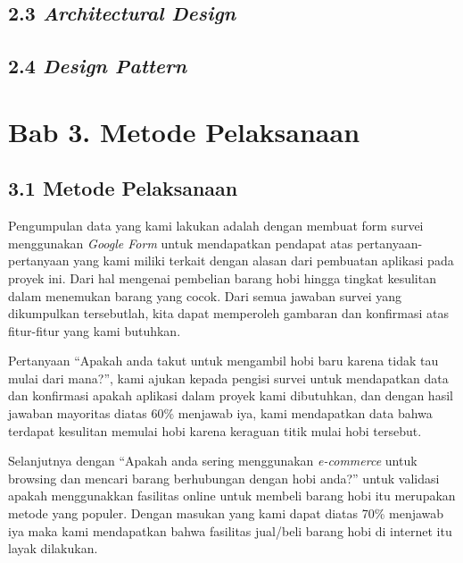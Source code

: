 \documentclass[a4paper]{article}
\begin{document}
\subsection*{2.3 \textit{Architectural Design}}

\subsection*{2.4 \textit{Design Pattern}}

\newpage
\section*{Bab 3. Metode Pelaksanaan}
\subsection*{3.1 Metode Pelaksanaan}


Pengumpulan data yang kami lakukan adalah dengan membuat form survei menggunakan \textit{Google Form} untuk mendapatkan pendapat atas pertanyaan-pertanyaan yang kami miliki terkait dengan alasan dari pembuatan aplikasi pada proyek ini. Dari hal mengenai pembelian barang hobi hingga tingkat kesulitan dalam menemukan barang yang cocok. Dari semua jawaban survei yang dikumpulkan tersebutlah, kita dapat memperoleh gambaran dan konfirmasi atas fitur-fitur yang kami butuhkan.


Pertanyaan “Apakah anda takut untuk mengambil hobi baru karena tidak tau mulai dari mana?”, kami ajukan kepada pengisi survei untuk mendapatkan data dan konfirmasi apakah aplikasi dalam proyek kami dibutuhkan, dan dengan hasil jawaban mayoritas diatas 60\% menjawab iya, kami mendapatkan data bahwa terdapat kesulitan memulai hobi karena keraguan titik mulai hobi tersebut.


Selanjutnya dengan “Apakah anda sering menggunakan \textit{e-commerce} untuk browsing dan mencari barang berhubungan dengan hobi anda?” untuk validasi apakah menggunakkan fasilitas online untuk membeli barang hobi itu merupakan metode yang populer. Dengan masukan yang kami dapat diatas 70\% menjawab iya maka kami mendapatkan bahwa fasilitas jual/beli barang hobi di internet itu layak dilakukan.
\end{document}

